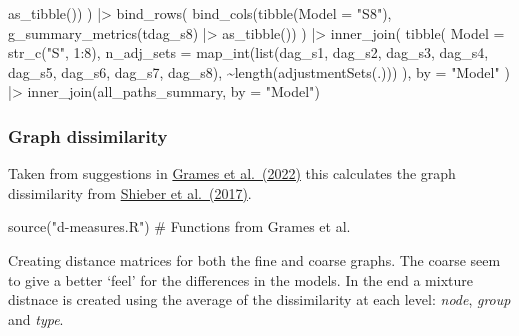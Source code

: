 \documentclass[
  letterpaper,
  DIV=11,
  numbers=noendperiod]{scrartcl}
\newenvironment{Shaded}{\begin{snugshade}}{\end{snugshade}}
\newcommand{\AttributeTok}[1]{\textcolor[rgb]{0.40,0.45,0.13}{#1}}
\newcommand{\CommentTok}[1]{\textcolor[rgb]{0.37,0.37,0.37}{#1}}
\newcommand{\DecValTok}[1]{\textcolor[rgb]{0.68,0.00,0.00}{#1}}
\newcommand{\FunctionTok}[1]{\textcolor[rgb]{0.28,0.35,0.67}{#1}}
\newcommand{\NormalTok}[1]{\textcolor[rgb]{0.00,0.23,0.31}{#1}}
\newcommand{\SpecialCharTok}[1]{\textcolor[rgb]{0.37,0.37,0.37}{#1}}
\newcommand{\StringTok}[1]{\textcolor[rgb]{0.13,0.47,0.30}{#1}}
\begin{document}
\begin{Shaded}
\begin{Highlighting}[]
              \FunctionTok{as\_tibble}\NormalTok{()) }
\NormalTok{    ) }\SpecialCharTok{|\textgreater{}} 
    \FunctionTok{bind\_rows}\NormalTok{(}
        \FunctionTok{bind\_cols}\NormalTok{(}\FunctionTok{tibble}\NormalTok{(}\AttributeTok{Model =} \StringTok{"S8"}\NormalTok{),}
          \FunctionTok{g\_summary\_metrics}\NormalTok{(tdag\_s8) }\SpecialCharTok{|\textgreater{}} 
              \FunctionTok{as\_tibble}\NormalTok{()) }
\NormalTok{    ) }\SpecialCharTok{|\textgreater{}} 
    \FunctionTok{inner\_join}\NormalTok{(}
        \FunctionTok{tibble}\NormalTok{(}
            \AttributeTok{Model =} \FunctionTok{str\_c}\NormalTok{(}\StringTok{"S"}\NormalTok{, }\DecValTok{1}\SpecialCharTok{:}\DecValTok{8}\NormalTok{),}
            \AttributeTok{n\_adj\_sets =} \FunctionTok{map\_int}\NormalTok{(}\FunctionTok{list}\NormalTok{(dag\_s1, dag\_s2, dag\_s3, dag\_s4, }
\NormalTok{                                      dag\_s5, dag\_s6, dag\_s7, dag\_s8), }
                                 \SpecialCharTok{\textasciitilde{}}\FunctionTok{length}\NormalTok{(}\FunctionTok{adjustmentSets}\NormalTok{(.)))}
\NormalTok{        ), }\AttributeTok{by =} \StringTok{"Model"}
\NormalTok{    ) }\SpecialCharTok{|\textgreater{}} 
    \FunctionTok{inner\_join}\NormalTok{(all\_paths\_summary, }\AttributeTok{by =} \StringTok{"Model"}\NormalTok{)}
\end{Highlighting}
\end{Shaded}

\subsubsection{Graph dissimilarity}\label{graph-dissimilarity}

Taken from suggestions in
\href{https://besjournals.onlinelibrary.wiley.com/doi/full/10.1111/2041-210X.13940}{Grames
et al.~(2022)} this calculates the graph dissimilarity from
\href{https://www.nature.com/articles/ncomms13928}{Shieber et
al.~(2017)}.

\begin{Shaded}
\begin{Highlighting}[]
\FunctionTok{source}\NormalTok{(}\StringTok{"d{-}measures.R"}\NormalTok{) }\CommentTok{\# Functions from Grames et al. }
\end{Highlighting}
\end{Shaded}

Creating distance matrices for both the fine and coarse graphs. The
coarse seem to give a better `feel' for the differences in the models.
In the end a mixture distnace is created using the average of the
dissimilarity at each level: \emph{node}, \emph{group} and \emph{type}.
\end{document}
